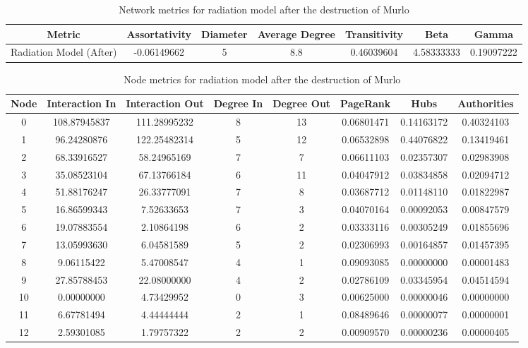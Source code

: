 \documentclass[12pt,a4paper]{thesis}
\begin{document}
\begin{table}[H]
\centering
\caption{Network metrics for radiation model after the destruction of Murlo}
\tiny
\begin{tabular}{|c|c|c|c|c|c|c|}
\hline Metric & Assortativity & Diameter & Average Degree & Transitivity & Beta & Gamma \\ 
\hline Radiation Model (After) & -0.06149662 & 5 & 8.8 & 0.46039604 & 4.58333333 & 0.19097222 \\ 
\hline 
\end{tabular} 
\label{tab:radNetAfter}
\end{table}

\begin{table}[H]
\centering
\caption{Node metrics for radiation model after the destruction of Murlo}
\tiny
\begin{tabular}{|c|c|c|c|c|c|c|c|}
\hline	Node	&	Interaction In	&	Interaction Out	&	Degree In	&	Degree Out	&	PageRank	&	Hubs	&	Authorities	\\
\hline	0	&	108.87945837	&	111.28995232	&	8	&	13	&	0.06801471	&	0.14163172	&	0.40324103	\\
\hline	1	&	96.24280876	&	122.25482314	&	5	&	12	&	0.06532898	&	0.44076822	&	0.13419461	\\
\hline	2	&	68.33916527	&	58.24965169	&	7	&	7	&	0.06611103	&	0.02357307	&	0.02983908	\\
\hline	3	&	35.08523104	&	67.13766184	&	6	&	11	&	0.04047912	&	0.03834858	&	0.02094712	\\
\hline	4	&	51.88176247	&	26.33777091	&	7	&	8	&	0.03687712	&	0.01148110	&	0.01822987	\\
\hline	5	&	16.86599343	&	7.52633653	&	7	&	3	&	0.04070164	&	0.00092053	&	0.00847579	\\
\hline	6	&	19.07883554	&	2.10864198	&	6	&	2	&	0.03333116	&	0.00305249	&	0.01855696	\\
\hline	7	&	13.05993630	&	6.04581589	&	5	&	2	&	0.02306993	&	0.00164857	&	0.01457395	\\
\hline	8	&	9.06115422	&	5.47008547	&	4	&	1	&	0.09093085	&	0.00000000	&	0.00001483	\\
\hline	9	&	27.85788453	&	22.08000000	&	4	&	2	&	0.02786109	&	0.03345954	&	0.04514594	\\
\hline	10	&	0.00000000	&	4.73429952	&	0	&	3	&	0.00625000	&	0.00000046	&	0.00000000	\\
\hline	11	&	6.67781494	&	4.44444444	&	2	&	1	&	0.08489646	&	0.00000077	&	0.00000001	\\
\hline	12	&	2.59301085	&	1.79757322	&	2	&	2	&	0.00909570	&	0.00000236	&	0.00000405	\\

\end{tabular}
\end{table}
\end{document}
